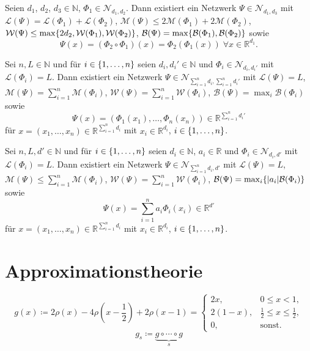 \documentclass[11pt]{scrartcl}
\newcommand{\N}{\mathbb{N}} %
\newcommand{\R}{\mathbb{R}} %
\begin{document}
\begin{lemma}
	Seien \(d_1\), \(d_2\), \(d_3 \in \N\), \(\Phi_1 \in \mathcal{N}_{d_1, d_2}\). Dann existiert ein 
	Netzwerk \(\Psi \in \mathcal{N}_{d_1, d_3}\) mit \(\mathcal{L}(\Psi) = \mathcal{L}(\Phi_1) + \mathcal{L}(\Phi_2)\), 
	\(\mathcal{M}(\Psi) \leq 2 \mathcal{M}(\Phi_1) + 2\mathcal{M}(\Phi_2)\), \(\mathcal{W}(\Psi) \leq 
	\max\{2d_2, \mathcal{W}(\Phi_1), \mathcal{W}(\Phi_2)\}\), \(\mathcal{B}(\Psi) = \max\{\mathcal{B}(\Phi_1), \mathcal{B}(\Phi_2)\}\) 
	sowie
	\[ \Psi(x) = (\Phi_2 \circ \Phi_1)(x) = \Phi_2(\Phi_1(x)) \;\forall x\in \R^{d_1}. \]
\end{lemma}

\begin{lemma}
	Sei \(n, L \in\N\) und für \(i\in \{1,\ldots, n\}\) seien \(d_i, d_i' \in \N\) und \(\Phi_i \in \mathcal{N}_{d_i, d_i'}\) 
	mit \(\mathcal{L}(\Phi_i) = L\). Dann existiert ein Netzwerk \(\Psi \in \mathcal{N}_{\sum_{i=1}^n d_i, \sum_{i=1}^n d_i'}\) 
	mit \(\mathcal{L}(\Psi) = L\), \(\mathcal{M}(\Psi) = \sum_{i=1}^n \mathcal{M}(\Phi_i)\), 
	\(\mathcal{W}(\Psi) = \sum_{i=1}^n \mathcal{W}(\Phi_i)\), \(\mathcal{B}(\Psi) = \max_i \mathcal{B}(\Phi_i)\) sowie 
	\[ \Psi(x) = (\Phi_1(x_1), \ldots, \Phi_n(x_n)) \in \R^{\sum_{i=1}^n d_i'} \]
	für \(x = (x_1, \ldots, x_n) \in \R^{\sum_{i=1}^n d_i}\) mit \(x_i \in \R^{d_i}\), \(i\in \{1,\ldots, n\}\).
\end{lemma}

\begin{lemma}
	Sei \(n, L, d' \in\N\) und für \(i\in \{1,\ldots, n\}\) seien \(d_i \in \N\), \(a_i \in \R\) und \(\Phi_i \in \mathcal{N}_{d_i, d'}\) 
	mit \(\mathcal{L}(\Phi_i) = L\). Dann existiert ein Netzwerk \(\Psi \in \mathcal{N}_{\sum_{i=1}^n d_i, d'}\) 
	mit \(\mathcal{L}(\Psi) = L\), \(\mathcal{M}(\Psi) \leq \sum_{i=1}^n \mathcal{M}(\Phi_i)\), 
	\(\mathcal{W}(\Psi) = \sum_{i=1}^n \mathcal{W}(\Phi_i)\), \(\mathcal{B}(\Psi) = \max_i \{|a_i| \mathcal{B}(\Phi_i)\}\) sowie 
	\[ \Psi(x) = \sum_{i=1}^n a_i \Phi_i(x_i) \in \R^{d'} \]
	für \(x = (x_1, \ldots, x_n) \in \R^{\sum_{i=1}^n d_i}\) mit \(x_i \in \R^{d_i}\), \(i\in \{1,\ldots, n\}\).
\end{lemma}

\section{Approximationstheorie}

\begin{definition}
	\[g(x) \coloneqq 2\rho(x) - 4 \rho(x - \frac{1}{2}) + 2\rho(x-1) = \begin{cases}
        2x, & 0\leq x < 1, \\ 
        2(1-x), & \frac{1}{2} \leq x \leq \frac{1}{2}, \\
        0, & \text{sonst.}
    \end{cases}\]
    \[g_s \coloneqq \underbrace{g \circ \cdots \circ g}_s \]
\end{definition}
\end{document}
